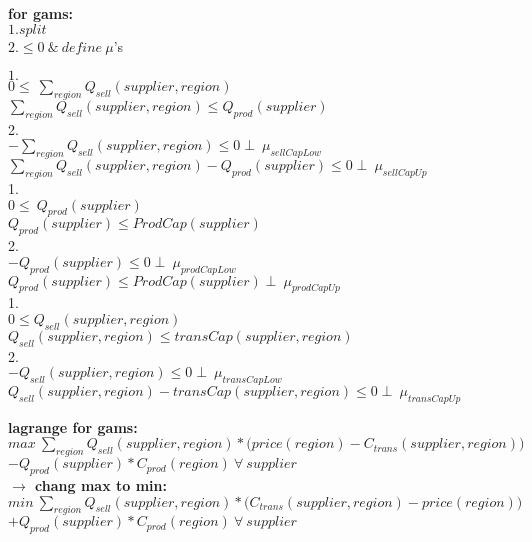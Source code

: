 \documentclass{article}
\begin{document}
\textbf{for gams:}\\
$1. split$\\
$2. \leq 0 \: \& \: define \:\mu$'s
\begin{center}

$1.$\\
	\(0 \leq\ \sum_{region} Q_{sell}(supplier, region) \)\\
	\(\sum_{region} Q_{sell}(supplier, region) \leq Q_{prod}(supplier)\)\\
2.\\
	\( - \sum_{region} Q_{sell}(supplier, region)  \leq 0  \perp\: \mu_{sellCapLow}\)\\
	\(\sum_{region} Q_{sell}(supplier, region) -  Q_{prod}(supplier)\leq 0 \perp\: \mu_{sellCapUp} \)\\


1.\\
	\(0 \leq\ Q_{prod}(supplier) \)\\  
	\(Q_{prod}(supplier) \leq ProdCap(supplier)\)\\
2.\\
	\( - Q_{prod}(supplier) \leq 0 \perp\: \mu_{prodCapLow}\)\\
	\(Q_{prod}(supplier) \leq ProdCap(supplier)\perp\: \mu_{prodCapUp}\)\\

1.\\
 	\(0 \leq Q_{sell}(supplier, region)\)\\
	\(Q_{sell}(supplier, region) \leq transCap(supplier, region)\)\\
2.\\
	\(- Q_{sell}(supplier, region) \leq 0  \perp\: \mu_{transCapLow}\)\\
	\(Q_{sell}(supplier, region) - transCap(supplier, region) \leq 0  \perp\: \mu_{transCapUp}\)\\
\end{center}

\newpage
\textbf{lagrange for gams:}\\
\( max\:\sum_{region} Q_{sell}(supplier, region) *\Big(price(region) - C_{trans}(supplier,region)\Big) \)\\
\tab\tab\(- Q_{prod}(supplier)*C_{prod}(region)\:\forall\: supplier\) \\

\textbf{$\rightarrow$ chang max to min:}\\

\( min\:\sum_{region} Q_{sell}(supplier, region) *\Big(C_{trans}(supplier,region) - price(region)\Big) \)\\
\tab\tab\(+ Q_{prod}(supplier)*C_{prod}(region)\:\forall\: supplier\) \\
\end{document}
